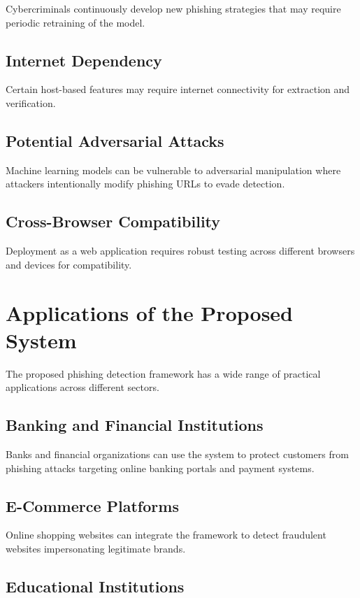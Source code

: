 \documentclass[12pt]{report}
\begin{document}
Cybercriminals continuously develop new phishing strategies that may require periodic retraining of the model.

\subsection{Internet Dependency}

Certain host-based features may require internet connectivity for extraction and verification.

\subsection{Potential Adversarial Attacks}

Machine learning models can be vulnerable to adversarial manipulation where attackers intentionally modify phishing URLs to evade detection.

\subsection{Cross-Browser Compatibility}

Deployment as a web application requires robust testing across different browsers and devices for compatibility.

\section{Applications of the Proposed System}

The proposed phishing detection framework has a wide range of practical applications across different sectors.

\subsection{Banking and Financial Institutions}

Banks and financial organizations can use the system to protect customers from phishing attacks targeting online banking portals and payment systems.

\subsection{E-Commerce Platforms}

Online shopping websites can integrate the framework to detect fraudulent websites impersonating legitimate brands.

\subsection{Educational Institutions}
\end{document}
